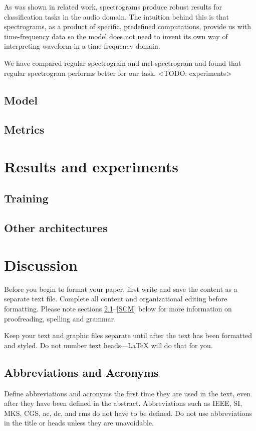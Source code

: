 \documentclass[conference]{IEEEtran}
\begin{document}
As was shown in related work, spectrograms produce robust results for classification tasks in the audio domain. The intuition behind this is that spectrograms, as a product of specific, predefined computations, provide us with time-frequency data so the model does not need to invent its own way of interpreting waveform in a time-frequency domain. 

We have compared regular spectrogram and mel-spectrogram and found that regular spectrogram performs better for our task.
<TODO: experiments>

\subsection{Model}

\subsection{Metrics}

\section{Results and experiments}

\subsection{Training}

\subsection{Other architectures}



\section{Discussion}
Before you begin to format your paper, first write and save the content as a 
separate text file. Complete all content and organizational editing before 
formatting. Please note sections \ref{AA}--\ref{SCM} below for more information on 
proofreading, spelling and grammar.

Keep your text and graphic files separate until after the text has been 
formatted and styled. Do not number text heads---{\LaTeX} will do that 
for you.

\subsection{Abbreviations and Acronyms}\label{AA}
Define abbreviations and acronyms the first time they are used in the text, 
even after they have been defined in the abstract. Abbreviations such as 
IEEE, SI, MKS, CGS, ac, dc, and rms do not have to be defined. Do not use 
abbreviations in the title or heads unless they are unavoidable.
\end{document}
